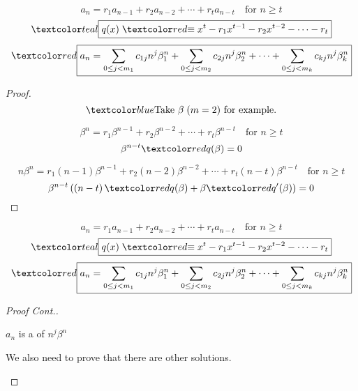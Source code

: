\begin{frame}{}
  \[
    a_n = r_1 a_{n-1} + r_2 a_{n-2} + \cdots + r_t a_{n-t} \quad \text{for } n \ge t
  \]
  \[
    \teal{\boxed{q(x) \;\red{\equiv}\; x^t - r_1 x^{t-1} - r_2 x^{t-2} - \cdots - r_t}}
  \]
  \[
    \red{\boxed{a_n = \sum_{0 \le j < m_1} c_{1j} n^j \beta_{1}^{n} 
      + \sum_{0 \le j < m_2} c_{2j} n^j \beta_{2}^{n} + \cdots 
      + \sum_{0 \le j < m_k} c_{kj} n^j \beta_{k}^{n}}}
  \]

  \pause
  \begin{proof}
    \[
      \blue{\text{Take } \beta \; (m = 2) \text{ for example.}}
    \]

    \pause
    \[
      \beta^n = r_1 \beta^{n-1} + r_2 \beta^{n-2} + \cdots + r_t \beta^{n-t} \quad \text{for } n \ge t
    \]
    \pause
    \vspace{-0.50cm}
    \[
      \beta^{n-t} \red{q(\beta)} = 0
    \]

    \pause
    \vspace{-0.50cm}
    \[
      n\beta^{n} = r_1 (n-1) \beta^{n-1} + r_2 (n-2) \beta^{n-2} + \cdots + r_t (n-t) \beta^{n-t} \quad \text{for } n \ge t
    \]
    \pause
    \vspace{-0.50cm}
    \[
      \beta^{n-t} \left(\left(n-t\right)\red{q(\beta)} + \beta \red{q'(\beta)}\right) = 0
    \]
  \end{proof}
\end{frame}

\begin{frame}{}
  \[
    a_n = r_1 a_{n-1} + r_2 a_{n-2} + \cdots + r_t a_{n-t} \quad \text{for } n \ge t
  \]
  \[
    \teal{\boxed{q(x) \;\red{\equiv}\; x^t - r_1 x^{t-1} - r_2 x^{t-2} - \cdots - r_t}}
  \]
  \[
    \red{\boxed{a_n = \sum_{0 \le j < m_1} c_{1j} n^j \beta_{1}^{n} 
      + \sum_{0 \le j < m_2} c_{2j} n^j \beta_{2}^{n} + \cdots 
      + \sum_{0 \le j < m_k} c_{kj} n^j \beta_{k}^{n}}}
  \]

  \begin{proof}[Proof Cont.]
    \begin{center}
      $a_n$ is a  of $n^{j} \beta^{n}$
      \\[15pt] \pause

      We also need to prove that there are  other solutions.
    \end{center}

    \pause
  \end{proof}
\end{frame}

